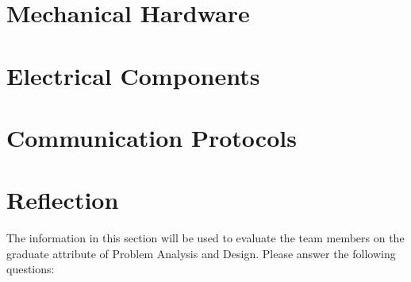 \documentclass[12pt, titlepage]{article}
\begin{document}
	\section{Mechanical Hardware}
	
	\section{Electrical Components}
	
	\section{Communication Protocols}
	
	\section{Reflection}
	
	The information in this section will be used to evaluate the team members on the
	graduate attribute of Problem Analysis and Design.  Please answer the following questions:
	
\end{document}
